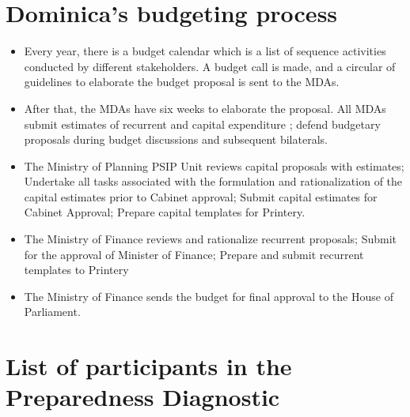 \documentclass[
  10pt,
]{book}
\begin{document}
\hypertarget{appendixC}{%
\chapter{Dominica's budgeting process}\label{appendixC}}

\begin{itemize}
\item
  Every year, there is a budget calendar which is a list of sequence activities conducted by different stakeholders. A budget call is made, and a circular of guidelines to elaborate the budget proposal is sent to the MDAs.
\item
  After that, the MDAs have six weeks to elaborate the proposal. All MDAs submit estimates of recurrent and capital expenditure ; defend budgetary proposals during budget discussions and subsequent bilaterals.
\item
  The Ministry of Planning PSIP Unit reviews capital proposals with estimates; Undertake all tasks associated with the formulation and rationalization of the capital estimates prior to Cabinet approval; Submit capital estimates for Cabinet Approval; Prepare capital templates for Printery.
\item
  The Ministry of Finance reviews and rationalize recurrent proposals; Submit for the approval of Minister of Finance; Prepare and submit recurrent templates to Printery
\item
  The Ministry of Finance sends the budget for final approval to the House of Parliament.
\end{itemize}

\hypertarget{appendixD}{%
\chapter{List of participants in the Preparedness Diagnostic}\label{appendixD}}
\end{document}
